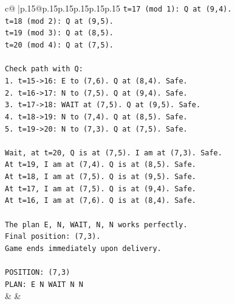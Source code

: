 \documentclass{article}
\begin{document}
{\begin{supertabular}{c@{$\;$}|p{.15\linewidth}@{}p{.15\linewidth}p{.15\linewidth}p{.15\linewidth}p{.15\linewidth}p{.15\linewidth}}
{{{\texttt{t=17 (mod 1): Q at (9,4).} \\
\texttt{t=18 (mod 2): Q at (9,5).} \\
\texttt{t=19 (mod 3): Q at (8,5).} \\
\texttt{t=20 (mod 4): Q at (7,5).} \\
\\ 
\texttt{Check path with Q:} \\
\texttt{1. t=15{-}>16: E to (7,6). Q at (8,4). Safe.} \\
\texttt{2. t=16{-}>17: N to (7,5). Q at (9,4). Safe.} \\
\texttt{3. t=17{-}>18: WAIT at (7,5). Q at (9,5). Safe.} \\
\texttt{4. t=18{-}>19: N to (7,4). Q at (8,5). Safe.} \\
\texttt{5. t=19{-}>20: N to (7,3). Q at (7,5). Safe.} \\
\\ 
\texttt{Wait, at t=20, Q is at (7,5). I am at (7,3). Safe.} \\
\texttt{At t=19, I am at (7,4). Q is at (8,5). Safe.} \\
\texttt{At t=18, I am at (7,5). Q is at (9,5). Safe.} \\
\texttt{At t=17, I am at (7,5). Q is at (9,4). Safe.} \\
\texttt{At t=16, I am at (7,6). Q is at (8,4). Safe.} \\
\\ 
\texttt{The plan E, N, WAIT, N, N works perfectly.} \\
\texttt{Final position: (7,3).} \\
\texttt{Game ends immediately upon delivery.} \\
\\ 
\texttt{POSITION: (7,3)} \\
\texttt{PLAN: E N WAIT N N} \\
            }
        }
    }
    & & \\ \\


\end{supertabular}}
\end{document}
